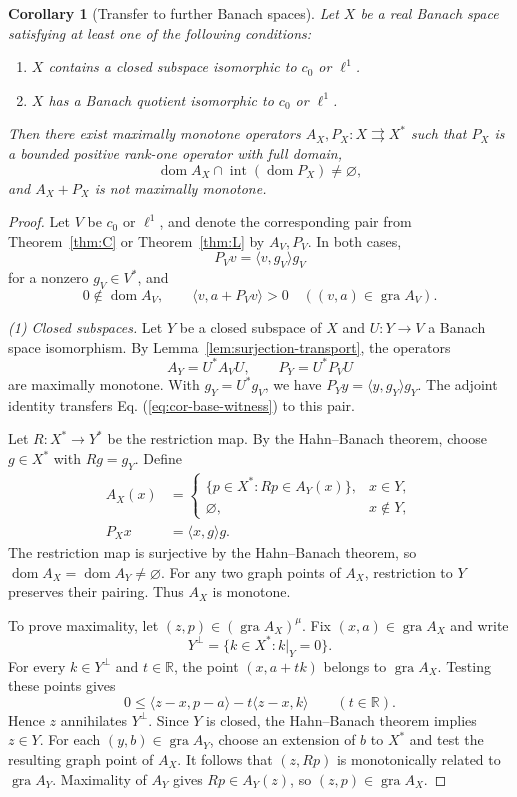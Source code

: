 \documentclass[11pt]{article}
\newcommand{\R}{\mathbb R}
\newcommand{\gra}{\operatorname{gra}}
\newcommand{\dom}{\operatorname{dom}}
\newcommand{\pair}[2]{\langle #1,#2\rangle}
\newtheorem{corollary}{Corollary}
\theoremstyle{definition}
\theoremstyle{remark}
\begin{document}
\begin{corollary}[Transfer to further Banach spaces]
\label{cor:space-transfer}
Let $X$ be a real Banach space satisfying at least one of the following conditions:
\begin{enumerate}
\item $X$ contains a closed subspace isomorphic to $c_0$ or $\ell^1$.
\item $X$ has a Banach quotient isomorphic to $c_0$ or $\ell^1$.
\end{enumerate}
Then there exist maximally monotone operators $A_X,P_X:X\rightrightarrows X^*$ such that $P_X$ is a bounded positive rank-one operator with full domain,
\[
\dom A_X\cap\operatorname{int}(\dom P_X)\ne\varnothing,
\]
and $A_X+P_X$ is not maximally monotone.
\end{corollary}
\begin{proof}
Let $V$ be $c_0$ or $\ell^1$, and denote the corresponding pair from Theorem~\ref{thm:C} or Theorem~\ref{thm:L} by $A_V,P_V$. In both cases,
\[
P_Vv=\pair{v}{g_V}g_V
\]
for a nonzero $g_V\in V^*$, and
\begin{equation}
0\notin\dom A_V,\qquad
\pair{v}{a+P_Vv}>0
\quad((v,a)\in\gra A_V).
\label{eq:cor-base-witness}
\end{equation}

\noindent\textit{(1) Closed subspaces.}
Let $Y$ be a closed subspace of $X$ and $U:Y\to V$ a Banach space isomorphism. By Lemma~\ref{lem:surjection-transport}, the operators
\[
A_Y=U^*A_VU,\qquad P_Y=U^*P_VU
\]
are maximally monotone. With $g_Y=U^*g_V$, we have $P_Yy=\pair{y}{g_Y}g_Y$. The adjoint identity transfers Eq. (\ref{eq:cor-base-witness}) to this pair.

Let $R:X^*\to Y^*$ be the restriction map. By the Hahn--Banach theorem, choose $g\in X^*$ with $Rg=g_Y$. Define
\[
\begin{aligned}
A_X(x)&=
\begin{cases}
\{p\in X^*:Rp\in A_Y(x)\},&x\in Y,\\
\varnothing,&x\notin Y,
\end{cases}\\
P_Xx&=\pair{x}{g}g.
\end{aligned}
\]
The restriction map is surjective by the Hahn--Banach theorem, so $\dom A_X=\dom A_Y\ne\varnothing$. For any two graph points of $A_X$, restriction to $Y$ preserves their pairing. Thus $A_X$ is monotone.

To prove maximality, let $(z,p)\in(\gra A_X)^\mu$. Fix $(x,a)\in\gra A_X$ and write
\[
Y^\perp=\{k\in X^*:k|_Y=0\}.
\]
For every $k\in Y^\perp$ and $t\in\R$, the point $(x,a+tk)$ belongs to $\gra A_X$. Testing these points gives
\[
0\le\pair{z-x}{p-a}-t\pair{z-x}{k}
\qquad(t\in\R).
\]
Hence $z$ annihilates $Y^\perp$. Since $Y$ is closed, the Hahn--Banach theorem implies $z\in Y$. For each $(y,b)\in\gra A_Y$, choose an extension of $b$ to $X^*$ and test the resulting graph point of $A_X$. It follows that $(z,Rp)$ is monotonically related to $\gra A_Y$. Maximality of $A_Y$ gives $Rp\in A_Y(z)$, so $(z,p)\in\gra A_X$.


\end{proof}
\end{document}
